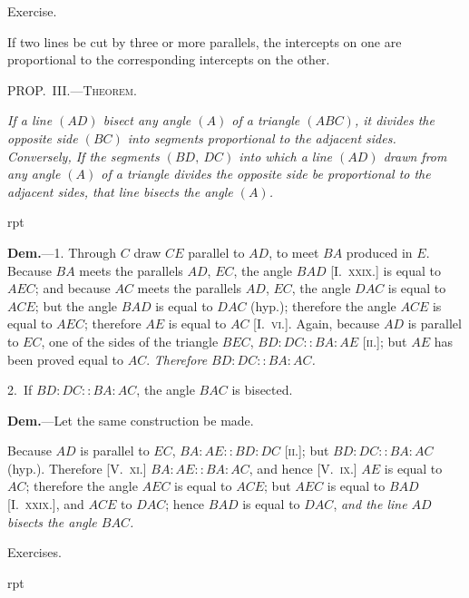 \documentclass[oneside]{book}
\newcommand\mypropl[2]{
\bigskip\Needspace*{4\baselineskip}\begin{center}\textsc{#1}\end{center}
\hspace{\parindent}\emph{#2}\par\medskip
}
\newcommand\exhead[1]{
\Needspace*{5\baselineskip}\begin{center}
\textsf{#1}
\end{center}
}
\newcommand\imgflow[3]{
\setcounter{wrapwidth}{#1}
\begin{wrapfigure}[#2]{r}{\value{wrapwidth}pt}
\begin{center}
\vspace{-0.3in}
\end{center}
\end{wrapfigure}
}
\begin{document}
\exhead{Exercise.}

\begin{footnotesize}
If two lines be cut by three or more parallels, the intercepts
on one are proportional to the corresponding intercepts on the
other.
\par\end{footnotesize}

\mypropl{PROP\@.~III\@.---Theorem.}{If a line $(AD)$ bisect any angle $(A)$ of a triangle $(ABC)$,
it divides the opposite side $(BC)$ into segments proportional
to the adjacent sides. \textrm{Conversely,} If the segments
$(BD,\ DC)$ into which a line $(AD)$ drawn from any angle
$(A)$ of a triangle divides the opposite side be proportional
to the adjacent sides, that line bisects the angle $(A)$.}

\imgflow{108}{8}{f171}

\textbf{Dem.}---1. Through $C$ draw $CE$ parallel to $AD$, to
meet $BA$ produced in $E$. Because $BA$ meets the
parallels $AD$, $EC$, the angle $BAD$ [I.~\textsc{xxix}.] is equal
to $AEC$; and because $AC$ meets the parallels $AD$, $EC$,
the angle $DAC$ is equal to $ACE$;
but the angle $BAD$ is equal to
$DAC$ (hyp.); therefore the angle
$ACE$ is equal to $AEC$; therefore
$AE$ is equal to $AC$ [I.~\textsc{vi}.]. Again,
because $AD$ is parallel to $EC$, one
of the sides of the triangle $BEC$,
$BD : DC :: BA : AE$ [\textsc{ii.}];\label{VIii} but
$AE$ has been proved equal to $AC$.  \emph{Therefore
$BD : DC :: BA : AC$.}

2.~If $BD : DC :: BA : AC$, the angle $BAC$ is bisected.

\textbf{Dem.}---Let the same construction be made.

Because $AD$ is parallel to $EC$, $BA: AE :: BD : DC$
\textsc{[ii.]}; but $BD : DC:: BA : AC$ (hyp.). Therefore
[V.~\textsc{xi}.] $BA : AE :: BA : AC$, and hence [V.~\textsc{ix}.] $AE$
is equal to $AC$; therefore the angle $AEC$ is equal to
$ACE$; but $AEC$ is equal to $BAD$ [I.~\textsc{xxix}.], and $ACE$
to $DAC$; hence $BAD$ is equal to $DAC$, \textit{and the line $AD$
bisects the angle $BAC$.}

\exhead{Exercises.}

\imgflow{142}{9}{f172}
\end{document}
